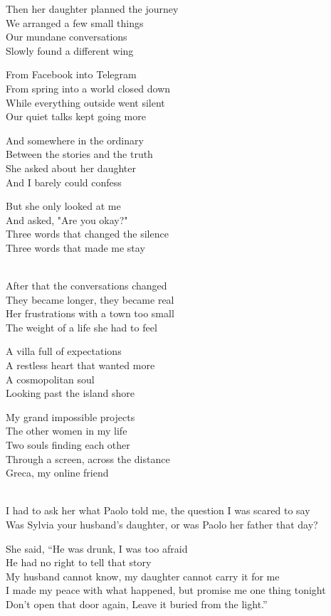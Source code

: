 \begin{lyrics}
Then her daughter planned the journey\\
We arranged a few small things\\
Our mundane conversations\\
Slowly found a different wing

From Facebook into Telegram\\
From spring into a world closed down\\
While everything outside went silent\\
Our quiet talks kept going more

And somewhere in the ordinary\\
Between the stories and the truth\\
She asked about her daughter\\
And I barely could confess

But she only looked at me\\
And asked, "Are you okay?"\\
Three words that changed the silence\\
Three words that made me stay

\\
After that the conversations changed\\
They became longer, they became real\\
Her frustrations with a town too small\\
The weight of a life she had to feel

A villa full of expectations\\
A restless heart that wanted more\\
A cosmopolitan soul\\
Looking past the island shore

My grand impossible projects\\
The other women in my life\\
Two souls finding each other\\
Through a screen, across the distance
\\
Greca, my online friend

\\
I had to ask her what Paolo told me, the question I was scared to say\\
Was Sylvia your husband's daughter, or was Paolo her father that day?

She said, “He was drunk, I was too afraid\\
He had no right to tell that story\\
My husband cannot know, my daughter cannot carry it for me\\
I made my peace with what happened, but promise me one thing tonight\\
Don't open that door again, Leave it buried from the light.”


\end{lyrics}
